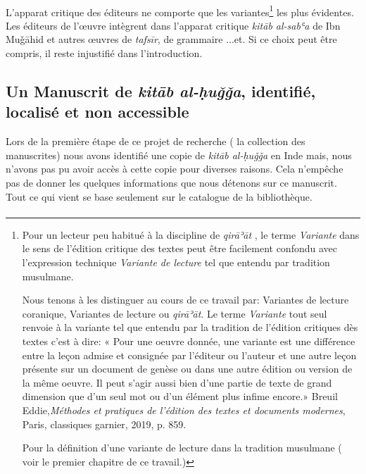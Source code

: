 \documentclass[a4paper,12pt]{report}
\begin{document}
\begin{itemize}
\begin{enumerate}
\paragraph{}
L'apparat critique  des éditeurs  ne comporte que les  variantes\footnote { Pour un lecteur peu habitué à la discipline  de \textit{ qirāʾāt} ,   le terme \textit{Variante} dans le sens de l'édition critique des textes  peut être facilement confondu avec  l'expression technique \textit{Variante de lecture} tel que entendu   par tradition musulmane. 

Nous tenons à les distinguer au cours de ce travail par: Variantes de lecture coranique, Variantes de lecture ou  \textit{ qirāʾāt}. Le terme \textit{Variante} tout seul renvoie à la variante tel que entendu par la tradition de l'édition critiques dès textes c'est à dire: « Pour une oeuvre donnée, une variante est une différence entre la leçon admise et consignée par l'éditeur ou l'auteur et une autre leçon présente sur un document de genèse ou dans une autre édition ou version de la même oeuvre. Il peut s'agir aussi bien d'une partie de texte de grand dimension que d'un seul mot ou d'un élément plus infime encore.»  Breuil Eddie,\textit{Méthodes et pratiques de l'édition  des textes et documents modernes}, Paris, classiques garnier, 2019, p. 859.  

Pour la définition d'une variante de lecture  dans la tradition musulmane ( voir le premier chapitre de ce travail.)}  les plus évidentes. Les éditeurs de l'œuvre intègrent dans  l'apparat critique  \textit{ kitāb al-sabʿa} de Ibn Muǧāhid et autres œuvres de \textit{tafs\=ir},  de grammaire ...et. Si ce choix peut être compris, il  reste injustifié dans l'introduction. 

 
\subsection{ Un Manuscrit de  \textit{kitāb al-ḥuǧǧa}, identifié, localisé et non accessible  }

Lors de la première étape de ce projet de recherche ( la collection des  manuscrites) nous avons identifié une copie de \textit{ kitāb al-ḥuǧǧa }en Inde mais, nous n'avons pas pu avoir accès à cette copie  pour diverses raisons. Cela n'empêche pas de donner les quelques informations que nous détenons  sur ce manuscrit. Tout ce qui vient se base seulement sur le catalogue de la bibliothèque. 

\paragraph{}


\end{enumerate}
\end{itemize}
\end{document}
